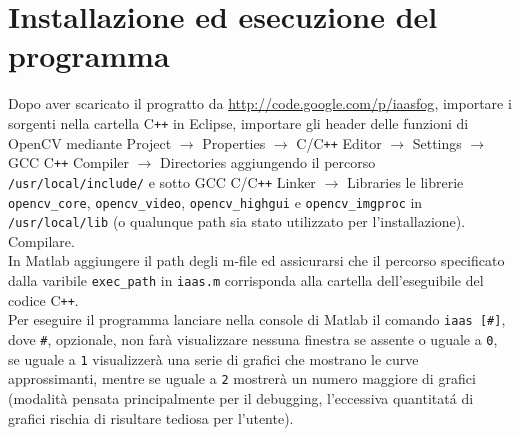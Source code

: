 \documentclass[12pt]{report}
\begin{document}
\section{Installazione ed esecuzione del programma}

\noindent Dopo aver scaricato il progratto da \url{http://code.google.com/p/iaasfog}, importare i sorgenti nella cartella C\verb|++| in Eclipse, importare gli header delle funzioni di OpenCV mediante Project $\rightarrow$ Properties  $\rightarrow$ C\slash C\verb|++| Editor $\rightarrow$ Settings $\rightarrow$ GCC C\verb|++| Compiler $\rightarrow$ Directories aggiungendo il percorso \verb|/usr/local/include/| e sotto GCC C\slash C\verb|++| Linker $\rightarrow$ Libraries le librerie \verb|opencv_core|, \verb|opencv_video|, \verb|opencv_highgui| e \verb|opencv_imgproc| in \verb|/usr/local/lib| (o qualunque path sia stato utilizzato per l'installazione).\\
Compilare.\\

\noindent In Matlab aggiungere il path degli m-file ed assicurarsi che il percorso specificato dalla varibile \verb|exec_path| in \verb|iaas.m| corrisponda alla cartella dell'eseguibile del codice C\verb|++|.\\
Per eseguire il programma lanciare nella console di Matlab il comando \verb|iaas [#]|, dove \verb|#|, opzionale, non far\`a visualizzare nessuna finestra se assente o uguale a \verb|0|, se uguale a \verb|1| visualizzer\`a una serie di grafici che mostrano le curve approssimanti, mentre se uguale a \verb|2| mostrer\`a un numero maggiore di grafici (modalit\`a pensata principalmente per il debugging, l'eccessiva quantitat\'a di grafici rischia di risultare tediosa per l'utente).

\end{document}
